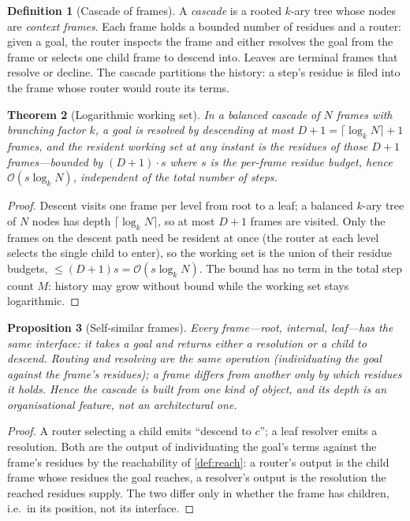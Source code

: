 \documentclass[11pt,twocolumn,a4paper]{article}
\theoremstyle{thmstyle}
\newtheorem{theorem}{Theorem}[section]
\newtheorem{proposition}[theorem]{Proposition}
\theoremstyle{definition}
\newtheorem{definition}[theorem]{Definition}
\theoremstyle{remark}
\begin{document}
\begin{definition}[Cascade of frames]
\label{def:cascade}
A \emph{cascade} is a rooted $k$-ary tree whose nodes are \emph{context frames}.
Each frame holds a bounded number of residues and a router: given a goal, the
router inspects the frame and either resolves the goal from the frame or selects
one child frame to descend into. Leaves are terminal frames that resolve or
decline. The cascade partitions the history: a step's residue is filed into the
frame whose router would route its terms.
\end{definition}

\begin{theorem}[Logarithmic working set]
\label{thm:cascade}
In a balanced cascade of $N$ frames with branching factor $k$, a goal is resolved
by descending at most $D+1=\lceil\log_k N\rceil+1$ frames, and the resident
working set at any instant is the residues of those $D+1$ frames---bounded by
$(D+1)\cdot s$ where $s$ is the per-frame residue budget, hence
$\mathcal{O}(s\log_k N)$, independent of the total number of steps.
\end{theorem}

\begin{proof}
Descent visits one frame per level from root to a leaf; a balanced $k$-ary tree
of $N$ nodes has depth $\lceil\log_k N\rceil$, so at most $D+1$ frames are
visited. Only the frames on the descent path need be resident at once (the router
at each level selects the single child to enter), so the working set is the union
of their residue budgets, $\le(D+1)s=\mathcal{O}(s\log_k N)$. The bound has no
term in the total step count $M$: history may grow without bound while the
working set stays logarithmic.
\end{proof}

\begin{proposition}[Self-similar frames]
\label{prop:selfsimilar}
Every frame---root, internal, leaf---has the same interface: it takes a goal and
returns either a resolution or a child to descend. Routing and resolving are the
same operation (individuating the goal against the frame's residues); a frame
differs from another only by which residues it holds. Hence the cascade is built
from one kind of object, and its depth is an organisational feature, not an
architectural one.
\end{proposition}

\begin{proof}
A router selecting a child emits ``descend to $c$''; a leaf resolver emits a
resolution. Both are the output of individuating the goal's terms against the
frame's residues by the reachability of \cref{def:reach}: a router's output is
the child frame whose residues the goal reaches, a resolver's output is the
resolution the reached residues supply. The two differ only in whether the frame
has children, i.e.\ in its position, not its interface.
\end{proof}
\end{document}
